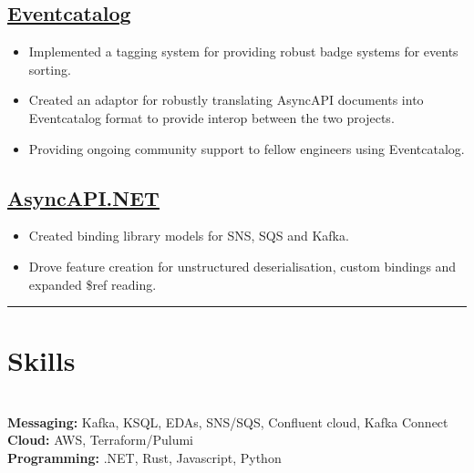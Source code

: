 \documentclass[12pt]{IEEEtran}
\newcommand{\cvrule}{\noindent\rule{8.5cm}{0.4pt}}
\begin{document}
{
\color{blue}
\subsection*{\href{https://github.com/boyney123/eventcatalog}{\underline{Eventcatalog}}}
}
\begin{itemize}[topsep=\parskip]
\item Implemented a tagging system for providing robust badge systems for events sorting.
\item Created an adaptor for robustly translating AsyncAPI documents into Eventcatalog format to provide interop between the two projects.
\item Providing ongoing community support to fellow engineers using Eventcatalog. \\
\end{itemize}


{
\color{blue}
\subsection*{\href{https://github.com/LEGO/AsyncAPI.NET}{\underline{AsyncAPI.NET}}}
}
\begin{itemize}[topsep=\parskip]
\item Created binding library models for SNS, SQS and Kafka.
\item Drove feature creation for unstructured deserialisation, custom bindings and expanded \$ref reading.
\end{itemize}

\iffalse
\vskip 1in
\lipsum[1-2]
\vfill\null
\columnbreak
\fi

\cvrule



\section*{\textbf{Skills}}

 \\[3pt]
\textbf{Messaging:}  Kafka, KSQL, EDAs, SNS/SQS, Confluent cloud, Kafka Connect \\[3pt]
\textbf{Cloud:} AWS, Terraform/Pulumi  \\[3pt]
\textbf{Programming:} .NET, Rust, Javascript, Python
\end{document}
